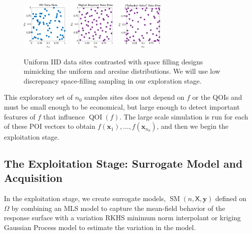 \documentclass[11pt]{NSFamsart}
\DeclareMathOperator{\QOI}{QOI} %
\DeclareMathOperator{\SURR}{SM} %
\newcommand{\mX}{\mathsf{X}}
\newcommand{\bx}{{\boldsymbol{x}}}
\newcommand{\by}{{\boldsymbol{y}}}
\begin{document}
\begin{figure} %
\centering
\includegraphics[width = 0.20\textwidth]{ProgramsImages/IIDPoints.eps} \ 
\includegraphics[width = 0.20\textwidth]{ProgramsImages/SSobolPoints.eps} \ 
\includegraphics[width = 0.20\textwidth]{ProgramsImages/ChebSSobolPoints.eps} 
\caption{Uniform IID data sites contrasted with space filling designs mimicking the uniform  and arcsine distributions.
We will use low discrepancy space-filling sampling in our exploration stage.
\label{PtsFig}}
\end{figure}


This exploratory set of $n_0$ samples sites does not depend on $f$ or the QOIs and must be small enough to be economical, but large enough to detect important features of $f$ that influence $\QOI(f)$. The large scale simulation is run for each of these POI vectors to obtain $f(\bx_1), \ldots, f(\bx_{n_0})$, and then we begin the exploitation stage.

\subsection{The Exploitation Stage: Surrogate Model and Acquisition} \label{sec:SurrMod}

In the exploitation stage, we create surrogate models, $\SURR(n,\mX,\by)$ defined on $\Omega$ by combining an MLS model to capture the mean-field behavior of the response surface with a 
variation RKHS minimum norm interpolant or kriging Gaussian Process model to estimate the variation in the model. 
\end{document}
